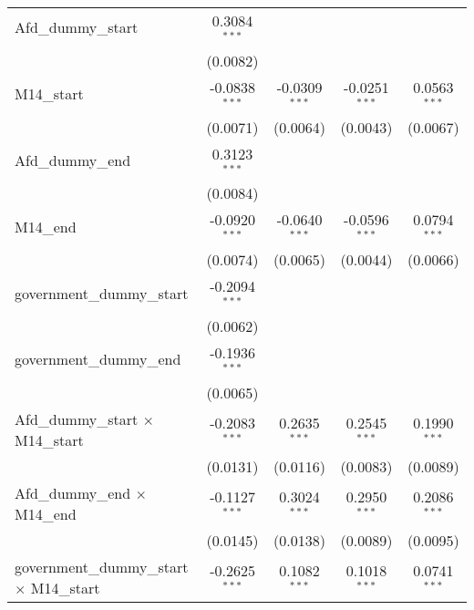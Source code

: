 \documentclass[10pt,a4paper]{article}
\begin{document}
\begin{tabular}{lcccc}
   Afd\_dummy\_start                                & 0.3084$^{***}$  &                 &                 &   \\   
                                                    & (0.0082)        &                 &                 &   \\   
   M14\_start                                       & -0.0838$^{***}$ & -0.0309$^{***}$ & -0.0251$^{***}$ & 0.0563$^{***}$\\   
                                                    & (0.0071)        & (0.0064)        & (0.0043)        & (0.0067)\\   
   Afd\_dummy\_end                                  & 0.3123$^{***}$  &                 &                 &   \\   
                                                    & (0.0084)        &                 &                 &   \\   
   M14\_end                                         & -0.0920$^{***}$ & -0.0640$^{***}$ & -0.0596$^{***}$ & 0.0794$^{***}$\\   
                                                    & (0.0074)        & (0.0065)        & (0.0044)        & (0.0066)\\   
   government\_dummy\_start                         & -0.2094$^{***}$ &                 &                 &   \\   
                                                    & (0.0062)        &                 &                 &   \\   
   government\_dummy\_end                           & -0.1936$^{***}$ &                 &                 &   \\   
                                                    & (0.0065)        &                 &                 &   \\   
   Afd\_dummy\_start $\times$ M14\_start            & -0.2083$^{***}$ & 0.2635$^{***}$  & 0.2545$^{***}$  & 0.1990$^{***}$\\   
                                                    & (0.0131)        & (0.0116)        & (0.0083)        & (0.0089)\\   
   Afd\_dummy\_end $\times$ M14\_end                & -0.1127$^{***}$ & 0.3024$^{***}$  & 0.2950$^{***}$  & 0.2086$^{***}$\\   
                                                    & (0.0145)        & (0.0138)        & (0.0089)        & (0.0095)\\   
   government\_dummy\_start $\times$ M14\_start     & -0.2625$^{***}$ & 0.1082$^{***}$  & 0.1018$^{***}$  & 0.0741$^{***}$\\   

\end{tabular}
\end{document}
